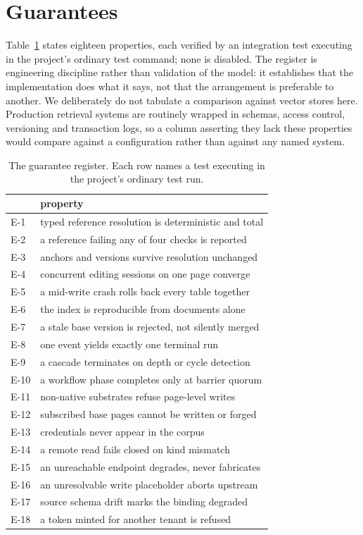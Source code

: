 \documentclass[journal,nofonttune]{IEEEtran}
\newcommand{\expref}[1]{\textsf{E-#1}}
\begin{document}
\section{Guarantees}
\label{sec:guarantees}

Table~\ref{tab:guarantees} states eighteen properties, each verified by an
integration test executing in the project's ordinary test command; none is
disabled. The register is engineering discipline rather than validation of
the model: it establishes that the implementation does what it says, not that
the arrangement is preferable to another. We deliberately do not tabulate a
comparison against vector stores here. Production retrieval systems are
routinely wrapped in schemas, access control, versioning and transaction
logs, so a column asserting they lack these properties would compare against
a configuration rather than against any named system.

\begin{table}[!t]
\caption{The guarantee register. Each row names a test executing in the
project's ordinary test run.}
\label{tab:guarantees}
\centering
\footnotesize
\begin{tabular}{ll}
\toprule
 & property \\
\midrule
\expref{1} & typed reference resolution is deterministic and total \\
\expref{2} & a reference failing any of four checks is reported \\
\expref{3} & anchors and versions survive resolution unchanged \\
\expref{4} & concurrent editing sessions on one page converge \\
\expref{5} & a mid-write crash rolls back every table together \\
\expref{6} & the index is reproducible from documents alone \\
\expref{7} & a stale base version is rejected, not silently merged \\
\expref{8} & one event yields exactly one terminal run \\
\expref{9} & a cascade terminates on depth or cycle detection \\
\expref{10} & a workflow phase completes only at barrier quorum \\
\expref{11} & non-native substrates refuse page-level writes \\
\expref{12} & subscribed base pages cannot be written or forged \\
\expref{13} & credentials never appear in the corpus \\
\expref{14} & a remote read fails closed on kind mismatch \\
\expref{15} & an unreachable endpoint degrades, never fabricates \\
\expref{16} & an unresolvable write placeholder aborts upstream \\
\expref{17} & source schema drift marks the binding degraded \\
\expref{18} & a token minted for another tenant is refused \\
\bottomrule
\end{tabular}
\end{table}
\end{document}
